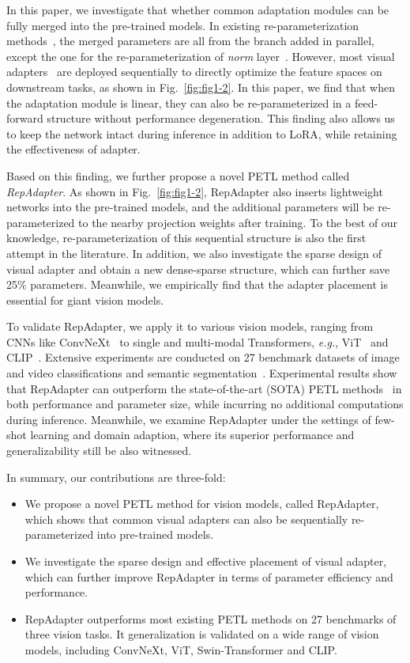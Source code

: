 In this paper, we investigate that whether common adaptation modules can be fully merged into the pre-trained models. In existing  re-parameterization methods~\cite{repvgg,acnet,dbbnet,lora}, the merged parameters are all from the branch added in parallel,  except the one for the re-parameterization of \emph{norm} layer~\cite{ssf}.  However, most visual adapters~\cite{adapter,vladapter,noah} are deployed sequentially to directly optimize the feature spaces on downstream tasks, as shown in Fig.~\ref{fig:fig1-2}. In this paper, we find that when the adaptation module is linear, they can also be re-parameterized in a feed-forward structure without performance degeneration.    This finding also allows us to keep the network  intact during inference  in addition to LoRA, while retaining the effectiveness of  adapter. 

Based on this finding, we further propose a novel PETL method called \emph{RepAdapter}. As shown in Fig.~\ref{fig:fig1-2}, RepAdapter also inserts lightweight networks into the pre-trained models, and the additional parameters will be re-parameterized to the nearby projection weights after training.   To the best of our knowledge,   re-parameterization  of this sequential   structure is also the first attempt in the literature. In addition, we also investigate the sparse design of visual adapter and obtain a new dense-sparse structure, which can further save 25\% parameters. Meanwhile, we empirically find that  the adapter placement is  essential for giant vision models. 

To validate RepAdapter, we   apply it to various vision models, ranging from   CNNs like ConvNeXt~\cite{convnext} to    single and multi-modal Transformers, \emph{e.g.}, ViT~\cite{vit} and CLIP~\cite{clip}. Extensive experiments are conducted on 27 benchmark datasets of image and video classifications and semantic segmentation~\cite{vtab,imagenet,imageneta,imagenetr,imagenets,ade20k,ssv2,hmdb}.     Experimental results show that RepAdapter can outperform the state-of-the-art (SOTA) PETL methods~\cite{adaptformer,noah,vpt,cocoop} in both performance and  parameter size, while  incurring no  additional computations during inference. Meanwhile, we  examine RepAdapter under  the settings of  few-shot learning and domain adaption, where its superior performance and generalizability  still be  also witnessed. 

In summary, our contributions are three-fold:

\begin{itemize}
\item We propose a novel PETL method for vision models, called RepAdapter, which shows that common visual adapters can also be sequentially re-parameterized into pre-trained models. 
\item  We investigate the sparse design and effective placement of visual adapter, which can further improve RepAdapter in terms of parameter efficiency and performance.
\item RepAdapter outperforms most existing PETL methods on 27 benchmarks of three vision tasks. It generalization is validated on a wide range of vision models, including ConvNeXt, ViT, Swin-Transformer  and CLIP. 
\end{itemize}


